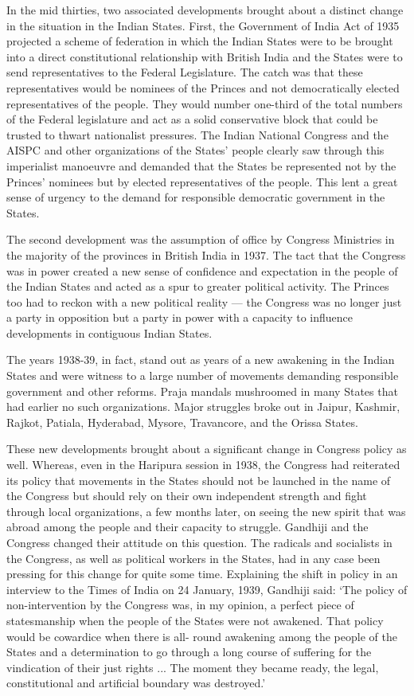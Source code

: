 In the mid thirties, two associated developments brought about a distinct change in the situation in the Indian States. First, the Government of India Act of 1935 projected a scheme of federation in which the Indian States were to be brought into a direct constitutional relationship with British India and the States were to send representatives to the Federal Legislature. The catch was that these representatives would be nominees of the Princes and not democratically elected representatives of the people. They would number one-third of the total numbers of the Federal legislature and act as a solid conservative block that could be trusted to thwart nationalist pressures. The Indian National Congress and the AISPC and other organizations of the States' people clearly saw through this imperialist manoeuvre and demanded that the States be represented not by the Princes' nominees but by elected representatives of the people. This lent a great sense of urgency to the demand for responsible democratic government in the States. 

The second development was the assumption of office by Congress Ministries in the majority of the provinces in British India in 1937. The tact that the Congress was in power created a new sense of confidence and expectation in the people of the Indian States and acted as a spur to greater political activity. The Princes too had to reckon with a new political reality — the Congress was no longer just a party in opposition but a party in power with a capacity to influence developments in contiguous Indian States. 

The years 1938-39, in fact, stand out as years of a new awakening in the Indian States and were witness to a large number of movements demanding responsible government and other reforms. Praja mandals mushroomed in many States that had earlier no such organizations. Major struggles broke out in Jaipur, Kashmir, Rajkot, Patiala, Hyderabad, Mysore, Travancore, and the Orissa States. 

These new developments brought about a significant change in Congress policy as well. Whereas, even in the Haripura session in 1938, the Congress had reiterated its policy that movements in the States should not be launched in the name of the Congress but should rely on their own independent strength and fight through local organizations, a few months later, on seeing the new spirit that was abroad among the people and their capacity to struggle. Gandhiji and the Congress changed their attitude on this question. The radicals and socialists in the Congress, as well as political workers in the States, had in any case been pressing for this change for quite some time. Explaining the shift in policy in an interview to the Times of India on 24 January, 1939, Gandhiji said: `The policy of non-intervention by the Congress was, in my opinion, a perfect piece of statesmanship when the people of the States were not awakened. That policy would be cowardice when there is all- round awakening among the people of the States and a determination to go through a long course of suffering for the vindication of their just rights ... The moment they became ready, the legal, constitutional and artificial boundary was destroyed.' 

